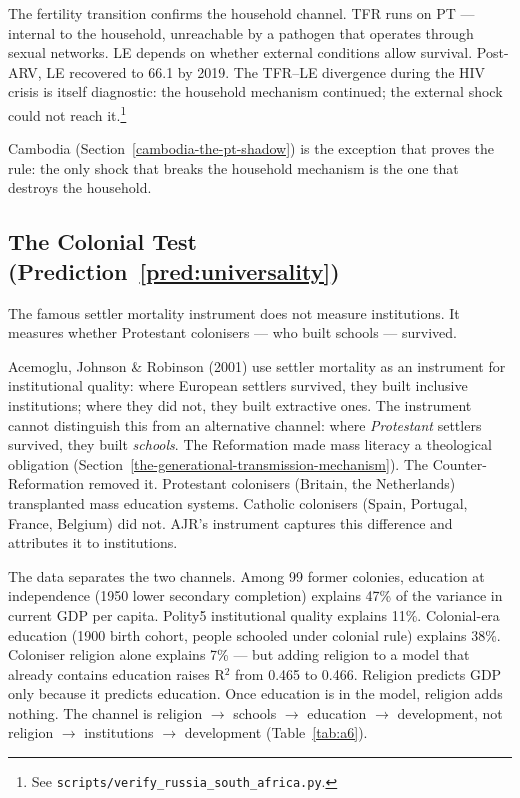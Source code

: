 \documentclass[12pt,letterpaper]{article}
\begin{document}
The fertility transition confirms the household channel. TFR runs on PT
--- internal to the household, unreachable by a pathogen that operates
through sexual networks. LE depends on whether external conditions allow
survival. Post-ARV, LE recovered to 66.1 by 2019. The TFR--LE divergence during the HIV crisis is itself
diagnostic: the household mechanism continued; the external shock could
not reach it.\footnote{See
\texttt{scripts/verify\_russia\_south\_africa.py}.}

Cambodia (Section~\ref{cambodia-the-pt-shadow}) is the exception that
proves the rule: the only shock that breaks the household mechanism is
the one that destroys the household.

\subsection{The Colonial Test (Prediction~\ref{pred:universality})}\label{the-colonial-test}

The famous settler mortality instrument does not measure institutions. It measures whether Protestant colonisers --- who built schools --- survived.

Acemoglu, Johnson \& Robinson (2001) use settler mortality as an
instrument for institutional quality: where European settlers survived,
they built inclusive institutions; where they did not, they built
extractive ones. The instrument cannot distinguish this from an
alternative channel: where \emph{Protestant} settlers survived, they
built \emph{schools}. The Reformation made mass literacy a theological
obligation (Section~\ref{the-generational-transmission-mechanism}). The Counter-Reformation removed it. Protestant
colonisers (Britain, the Netherlands) transplanted mass education
systems. Catholic colonisers (Spain, Portugal, France, Belgium) did not.
AJR's instrument captures this difference and attributes it to
institutions.

The data separates the two channels. Among 99 former colonies, education
at independence (1950 lower secondary completion) explains 47\% of the
variance in current GDP per capita. Polity5 institutional quality
explains 11\%. Colonial-era education (1900 birth cohort, people
schooled under colonial rule) explains 38\%. Coloniser religion alone
explains 7\% --- but adding religion to a model that already contains
education raises R$^2$ from 0.465 to 0.466. Religion predicts GDP only
because it predicts education. Once education is in the model, religion
adds nothing. The channel is religion $\to$ schools $\to$ education $\to$
development, not religion $\to$ institutions $\to$ development (Table~\ref{tab:a6}).
\end{document}
